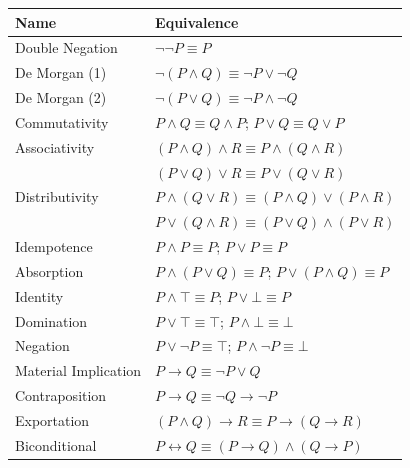 \begin{center}
\renewcommand{\arraystretch}{1.3}
\begin{tabular}{|l|l|}
\hline
\textbf{Name} & \textbf{Equivalence} \\
\hline
Double Negation & $\neg\neg P \equiv P$ \\
\hline
De Morgan (1) & $\neg(P \wedge Q) \equiv \neg P \vee \neg Q$ \\
De Morgan (2) & $\neg(P \vee Q) \equiv \neg P \wedge \neg Q$ \\
\hline
Commutativity & $P \wedge Q \equiv Q \wedge P$; \; $P \vee Q \equiv Q \vee P$ \\
\hline
Associativity & $(P \wedge Q) \wedge R \equiv P \wedge (Q \wedge R)$ \\
              & $(P \vee Q) \vee R \equiv P \vee (Q \vee R)$ \\
\hline
Distributivity & $P \wedge (Q \vee R) \equiv (P \wedge Q) \vee (P \wedge R)$ \\
               & $P \vee (Q \wedge R) \equiv (P \vee Q) \wedge (P \vee R)$ \\
\hline
Idempotence & $P \wedge P \equiv P$; \; $P \vee P \equiv P$ \\
\hline
Absorption & $P \wedge (P \vee Q) \equiv P$; \; $P \vee (P \wedge Q) \equiv P$ \\
\hline
Identity & $P \wedge \top \equiv P$; \; $P \vee \bot \equiv P$ \\
\hline
Domination & $P \vee \top \equiv \top$; \; $P \wedge \bot \equiv \bot$ \\
\hline
Negation & $P \vee \neg P \equiv \top$; \; $P \wedge \neg P \equiv \bot$ \\
\hline
Material Implication & $P \rightarrow Q \equiv \neg P \vee Q$ \\
\hline
Contraposition & $P \rightarrow Q \equiv \neg Q \rightarrow \neg P$ \\
\hline
Exportation & $(P \wedge Q) \rightarrow R \equiv P \rightarrow (Q \rightarrow R)$ \\
\hline
Biconditional & $P \leftrightarrow Q \equiv (P \rightarrow Q) \wedge (Q \rightarrow P)$ \\
\hline
\end{tabular}
\end{center}

